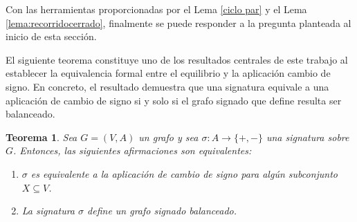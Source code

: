 \documentclass[11pt,a4paper,spanish]{report}
\theoremstyle{plain}
\newtheorem{teorema}{Teorema}[chapter]
\begin{document}
Con las herramientas proporcionadas por el Lema \ref{ciclo par} y el Lema \ref{lema:recorridocerrado},  finalmente se puede responder a la pregunta planteada al inicio de esta sección. 

El siguiente teorema constituye uno de los resultados centrales de este trabajo al establecer la equivalencia formal entre el equilibrio y la aplicación cambio de signo. En concreto, el resultado demuestra que una signatura equivale a una aplicación de cambio de signo si y solo si el grafo signado que define resulta ser balanceado.

\begin{teorema}\label{prop3.6}
Sea $G=(V,A)$ un grafo y sea $\sigma:A\to\{+,-\}$ una signatura sobre $G$.
Entonces, las siguientes afirmaciones son equivalentes:
\begin{enumerate}
    \item[(i)] $\sigma$ es equivalente a la aplicación de cambio de signo para algún subconjunto $X\subseteq V$.
    \item[(ii)] La signatura $\sigma$ define un grafo signado balanceado.
\end{enumerate}
\end{teorema}
\end{document}
